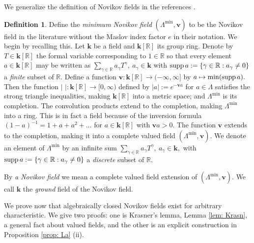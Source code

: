 \documentclass{article}
\theoremstyle{plain}%
\theoremstyle{definition}
\newtheorem{dfn}[thm]{Definition}
\numberwithin{equation}{section}
\numberwithin{figure}{section}
\def\l{\label}
\def\R{{\mathbin{\mathbb R}}}
\def\ga{\gamma}
\def\La{\Lambda}
\def\iy{\infty}
\def\k{{\mathbf{k}}}\def\b{{\mathbf{b}}}\def\x{{\mathbf{x}}}
\def\v{{\mathbf{v}}}\def\cl{{\rm cl}}\def\alg{{\rm alg}}\def\geom{{\rm geom}}\def\loc{{\rm loc}}\def\dirlim{\displaystyle\varinjlim}
\begin{document}
We generalize the definition of Novikov fields in the references \cite{AJ,FOOO}. 
\begin{dfn}\l{dfn: Novikov}
Define the {\it minimum Novikov field} $(\La^{\min},\v)$ to be the Novikov field in the literature \cite{AJ,FOOO} without the Maslov index factor $e$ in their notation. We begin by recalling this. Let $\k$ be a field and $\k[\R]$ its group ring. Denote by $T\in\k[\R]$ the formal variable corresponding to $1\in \R$ so that every element $a\in\k[\R]$ may be written as $\sum_{\ga\in\R}a_\ga T^\ga,\ a_\ga\in\k$ with $\supp a:=\{\ga\in\R:a_\ga\ne0\}$ a {\it finite} subset of $\R.$ 
Define a function $\v:\k[\R]\to(-\iy,\iy]$ by $a\mapsto\min(\operatorname{supp} a).$ Then the function $|\,\,|:\k[\R]\to[0,\iy)$ defined by $|a|:=e^{-\v a}$ for $a\in \La$ satisfies the strong triangle inequalities, making $\k[\R]$ into a metric space; and $\La^{\min}$ is its completion. The convolution products extend to the completion, making $\La^{\min}$ into a ring. This is in fact a field because of the inversion formula $(1-a)^{-1}=1+a+a^2+\dots$ for $a\in\k[\R]$ with $\v a>0.$ The function $\v$ extends to the completion, making it into a complete valued field $(\La^{\min},\v).$
We denote an element of $\La^{\min}$ by an infinite sum $\sum_{\ga\in\R}a_\ga T^\ga,\ a_\ga\in\k,$ with $\supp a:=\{\ga\in\R:a_\ga\ne0\}$ a {\it discrete} subset of $\R.$

By {\it a Novikov field} we mean a complete valued field extension of $(\La^{\min},\v).$
We call $\k$ the {\it ground} field of the Novikov field.
\end{dfn}

We prove now that algebraically closed Novikov fields exist for arbitrary characteristic. We give two proofs: one is Krasner's lemma, Lemma \ref{lem: Krasn}, a general fact about valued fields, and the other is an explicit construction in Proposition \ref{prop: La} (ii). 
\end{document}
